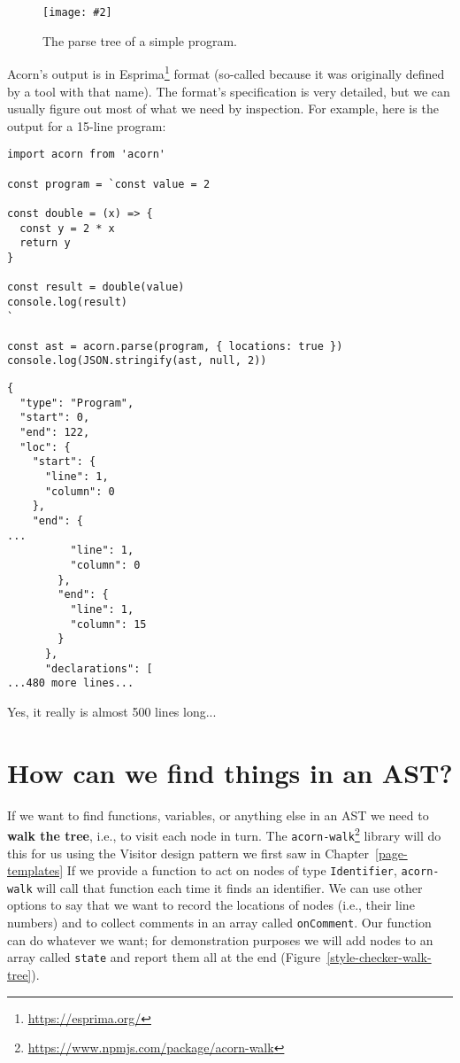 \documentclass[krantzl]{krantz}
\newcommand{\figpdfhere}[4]{\begin{figure}[h]%
\centering%
\texttt{[image: \#2]}%
\caption{#3}%
\label{#1}%
\end{figure}}
\newcommand{\chapref}[1]{Chapter~\ref{#1}}
\newcommand{\figref}[1]{Figure~\ref{#1}}
\newcommand{\glossref}[1]{\textbf{#1}}
\newcommand{\hreffoot}[2]{{#1}\footnote{\href{#2}{#2}}}
\begin{document}
\figpdfhere{style-checker-parse-tree}{./style-checker/parse-tree.pdf}{The parse tree of a simple program.}{0.6}


Acorn’s output is in \hreffoot{Esprima}{https://esprima.org/} format
(so-called because it was originally defined by a tool with that name).
The format’s specification is very detailed,
but we can usually figure out most of what we need by inspection.
For example,
here is the output for a 15-line program:


\begin{lstlisting}[frame=tblr]
import acorn from 'acorn'

const program = `const value = 2

const double = (x) => {
  const y = 2 * x
  return y
}

const result = double(value)
console.log(result)
`

const ast = acorn.parse(program, { locations: true })
console.log(JSON.stringify(ast, null, 2))
\end{lstlisting}



\begin{lstlisting}[frame=tblr,backgroundcolor=\color{black!5}]
{
  "type": "Program",
  "start": 0,
  "end": 122,
  "loc": {
    "start": {
      "line": 1,
      "column": 0
    },
    "end": {
...
          "line": 1,
          "column": 0
        },
        "end": {
          "line": 1,
          "column": 15
        }
      },
      "declarations": [
...480 more lines...
\end{lstlisting}



\noindent Yes, it really is almost 500 lines long...

\section{How can we find things in an AST?}\label{style-checker-search}


If we want to find functions, variables, or anything else in an AST
we need to \glossref{walk the tree},
i.e.,
to visit each node in turn.
The \hreffoot{\texttt{acorn-walk}}{https://www.npmjs.com/package/acorn-walk} library will do this for us
using the Visitor design pattern we first saw in \chapref{page-templates}
If we provide a function to act on nodes of type \texttt{Identifier},
\texttt{acorn-walk} will call that function each time it finds an identifier.
We can use other options to say that we want to record the locations of nodes (i.e., their line numbers)
and to collect comments in an array called \texttt{onComment}.
Our function can do whatever we want;
for demonstration purposes we will add nodes to an array called \texttt{state}
and report them all at the end
(\figref{style-checker-walk-tree}).
\end{document}
